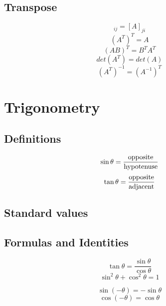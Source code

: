 \documentclass{article}
\begin{document}
		\subsection{Transpose}
			\begin{equation}
				[A^\mathrm{T}]_{ij} = [A]_{ji}
			\end{equation}
			\begin{equation}
				(A^T)^T = A
			\end{equation}
			\begin{equation}
				(AB)^T = B^TA^T %
			\end{equation}
			\begin{equation}
				det(A^T) = det(A)
			\end{equation}
			\begin{equation}
				(A^T)^{-1} = (A^{-1})^T
			\end{equation}
\section{Trigonometry}
	\subsection{Definitions}
		\begin{equation}
			\sin \theta = \frac{{{\rm{opposite}}}}{{{\rm{hypotenuse}}}}
		\end{equation}
		\begin{equation}
			\tan \theta = \frac{{{\rm{opposite}}}}{{{\rm{adjacent}}}}
		\end{equation}
	\subsection{Standard values}
	
	\subsection{Formulas and Identities}
		\begin{equation}
			\tan \theta = \frac{\sin \theta}{\cos \theta}
		\end{equation}
		\begin{equation}
			\sin^2 \theta + \cos^2 \theta = 1
		\end{equation}
		
		\begin{equation}
			\sin(-\theta) = - \sin \theta 
		\end{equation}
		\begin{equation}
			\cos(-\theta) = \cos \theta 
		\end{equation}
		
\end{document}
